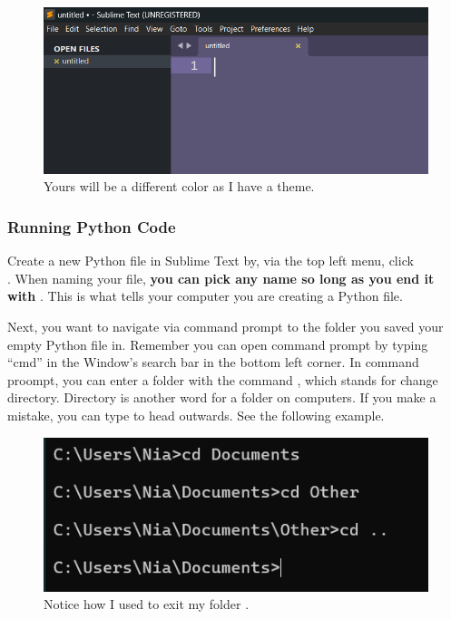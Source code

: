 \documentclass[12pt]{scrartcl}
\begin{document}
\begin{figure}[H]
    \centering
    \includegraphics[scale=0.6]{Sublime.png}
    \caption*{Yours will be a different color as I have a theme.}
\end{figure}

\subsubsection*{Running Python Code}
Create a new Python file in Sublime Text by, via the top left menu, click\\ . When naming your file, \textbf{you can pick any name so long as you end it with} . This is what tells your computer you are creating a Python file.

Next, you want to navigate via command prompt to the folder you saved your empty Python file in. Remember you can open command prompt by typing ``cmd'' in the Window's search bar in the bottom left corner. In command proompt, you can enter a folder with the command , which stands for change directory. Directory is another word for a folder on computers. If you make a mistake, you can type   to head outwards. See the following example.

\begin{figure}[H]
    \centering
    \includegraphics[scale=0.7]{Change Directory.png}
    \caption*{Notice how I used  to exit my folder .}
\end{figure}
\end{document}
